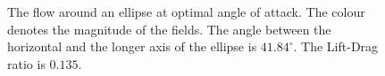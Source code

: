 \documentclass[12pt, a4paper]{article}
\begin{document}
        \begin{figure}[htbp]
            \centering
             \qquad
            \caption{The flow around an ellipse at optimal angle of attack. The colour denotes the magnitude of the fields. The angle between the horizontal and the longer axis of the ellipse is $41.84^{\circ}$. The Lift-Drag ratio is $0.135$.}
            \label{fig_opt_ellipse}
        \end{figure}
        
\end{document}
